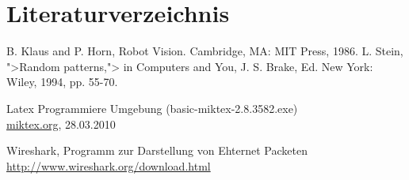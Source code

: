 %
%

\thispagestyle{empty}
\chapter{Literaturverzeichnis}\label{chap.literatur}

\begin{thebibliography}{99}


 B. Klaus and P. Horn, Robot Vision. Cambridge, MA: MIT Press, 1986.
 L. Stein, ">Random patterns,"> in Computers and You, J. S. Brake, Ed. New York: Wiley, 1994, pp. 55-70.






 Latex Programmiere Umgebung (basic-miktex-2.8.3582.exe)\\
\href{http://www.miktex.org/about}{miktex.org}, 28.03.2010

Wireshark, Programm zur Darstellung von Ehternet Packeten\\
\href{http://www.wireshark.org/download.html}{http://www.wireshark.org/download.html}



\end{thebibliography}

